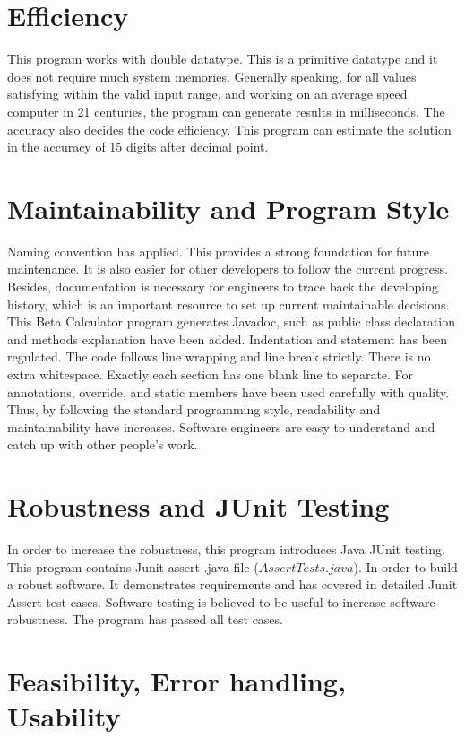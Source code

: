 \documentclass[10pt]{article}
\begin{document}
\section*{Efficiency}

This program works with double datatype. This is a primitive datatype and it does not require much system memories. Generally speaking, for all values satisfying within the valid input range, and working on an average speed computer in 21 centuries, the program can generate results in milliseconds. The accuracy also decides the code efficiency. This program can estimate the solution in the accuracy of 15 digits after decimal point. 

\section*{Maintainability and Program Style}

Naming convention has applied. This provides a strong foundation for future maintenance. It is also easier for other developers to follow the current progress. Besides, documentation is necessary for engineers to trace back the developing history, which is an important resource to set up current maintainable decisions. This Beta Calculator program generates Javadoc, such as public class declaration and methods explanation have been added. Indentation and statement has been regulated. The code follows line wrapping and line break strictly. There is no extra whitespace. Exactly each section has one blank line to separate. For annotations, override, and static members have been used carefully with quality. Thus, by following the standard programming style, readability and maintainability have increases. Software engineers are easy to understand and catch up with other people’s work. 


\section*{Robustness and JUnit Testing}

In order to increase the robustness, this program introduces Java JUnit testing. This program contains Junit assert .java file ($ AssertTests.java $). In order to build a robust software. It demonstrates requirements and has covered in detailed Junit Assert test cases. Software testing is believed to be useful to increase software robustness. The program has passed all test cases.


\section*{Feasibility, Error handling, Usability}
\end{document}
